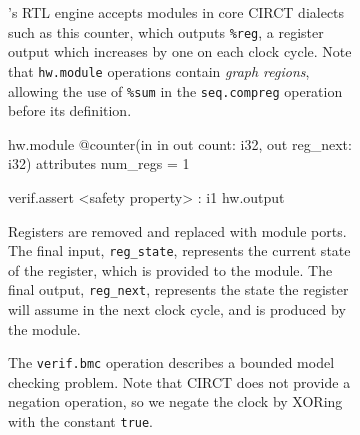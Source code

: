 \documentclass[acmsmall,screen,review]{acmart}
\begin{document}
\begin{figure}
  \begin{subfigure}[t]{0.48\textwidth}
  \caption{\toolname{}'s RTL engine accepts modules in core CIRCT dialects such as this counter, which outputs \texttt{\%reg}, a register output which increases by one on each clock cycle. Note that \texttt{hw.module} operations contain \emph{graph regions}, allowing the use of \texttt{\%sum}
   in the \texttt{seq.compreg} operation before its definition.}
  \label{lst:counter}
  \end{subfigure}
  \hfill
  \begin{subfigure}[t]{0.48\textwidth}
  \begin{xdsl}
  hw.module @counter(in %
      in %
      out count: i32, out reg_next: i32)
      attributes {num_regs = 1} {
    verif.assert <safety property> : i1
    hw.output %
     
    }
  \end{xdsl}
  \caption{Registers are removed and replaced with module ports. The final input, \texttt{reg\_state}, represents the current state of the register, which is provided to the module. The final output, \texttt{reg\_next}, represents the state the register will assume in the next clock cycle, and is produced by the module.}
  \label{lst:counter-ext-regs}
  \end{subfigure}
  \noindent\begin{subfigure}[t]{0.48\textwidth}
  \caption{The \texttt{verif.bmc} operation describes a bounded model checking problem. Note that CIRCT does not provide a negation operation, so we negate the clock by XORing with the constant \texttt{true}.}
    \label{lst:counter-bmc-op}
  \end{subfigure}
  \hfill
  \noindent\begin{subfigure}[t]{0.48\textwidth}
  \begin{xdsl}
  

\end{xdsl}
\end{subfigure}
\end{figure}
\end{document}
